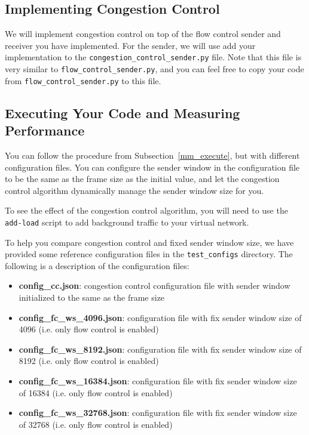 \documentclass[11pt]{article}
\begin{document}
\subsection{Implementing Congestion Control}
We will implement congestion control on top of the flow control sender and receiver you have implemented. For the sender, we will use add your implementation to the \texttt{congestion\_control\_sender.py} file. Note that this file is very similar to \texttt{flow\_control\_sender.py}, and you can feel free to copy your code from \texttt{flow\_control\_sender.py} to this file.

\subsection{Executing Your Code and Measuring Performance}
You can follow the procedure from Subsection~\ref{mm_execute}, but with different configuration files. You can configure the sender window in the configuration file to be the same as the frame size as the initial value, and let the congestion control algorithm dynamically manage the sender window size for you.

To see the effect of the congestion control algorithm, you will need to use the \texttt{add-load} script to add background traffic to your virtual network.

To help you compare congestion control and fixed sender window size, we have provided some reference configuration files in the \texttt{test\_configs} directory. The following is a description of the configuration files:
\begin{itemize}
    \item \textbf{config\_cc.json}: congestion control configuration file with sender window initialized to the same as the frame size
    \item \textbf{config\_fc\_ws\_4096.json}: configuration file with fix sender window size of 4096 (i.e. only flow control is enabled)
    \item \textbf{config\_fc\_ws\_8192.json}: configuration file with fix sender window size of 8192 (i.e. only flow control is enabled)
    \item \textbf{config\_fc\_ws\_16384.json}: configuration file with fix sender window size of 16384 (i.e. only flow control is enabled)
    \item \textbf{config\_fc\_ws\_32768.json}: configuration file with fix sender window size of 32768 (i.e. only flow control is enabled)
\end{itemize}
\end{document}
